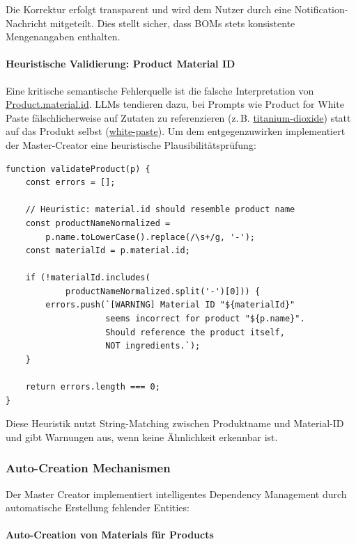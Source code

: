 \noindent Die Korrektur erfolgt transparent und wird dem Nutzer durch eine Notification-Nachricht mitgeteilt. Dies stellt sicher, dass BOMs stets konsistente Mengenangaben enthalten.

\paragraph{Heuristische Validierung: Product Material ID}

Eine kritische semantische Fehlerquelle ist die falsche Interpretation von \url{Product.material.id}. LLMs tendieren dazu, bei Prompts wie \glqq Product for White Paste\grqq{} fälschlicherweise auf Zutaten zu referenzieren (z.\,B. \url{titanium-dioxide}) statt auf das Produkt selbst (\url{white-paste}). Um dem entgegenzuwirken implementiert der Master-Creator eine heuristische Plausibilitätsprüfung:

\begin{verbatim}
function validateProduct(p) {
    const errors = [];

    // Heuristic: material.id should resemble product name
    const productNameNormalized =
        p.name.toLowerCase().replace(/\s+/g, '-');
    const materialId = p.material.id;

    if (!materialId.includes(
            productNameNormalized.split('-')[0])) {
        errors.push(`[WARNING] Material ID "${materialId}"
                    seems incorrect for product "${p.name}".
                    Should reference the product itself,
                    NOT ingredients.`);
    }

    return errors.length === 0;
}
\end{verbatim}

\noindent Diese Heuristik nutzt String-Matching zwischen Produktname und Material-ID und gibt Warnungen aus, wenn keine Ähnlichkeit erkennbar ist.

\subsubsection{Auto-Creation Mechanismen}

Der Master Creator implementiert intelligentes Dependency Management durch automatische Erstellung fehlender Entities:

\paragraph{Auto-Creation von Materials für Products}

